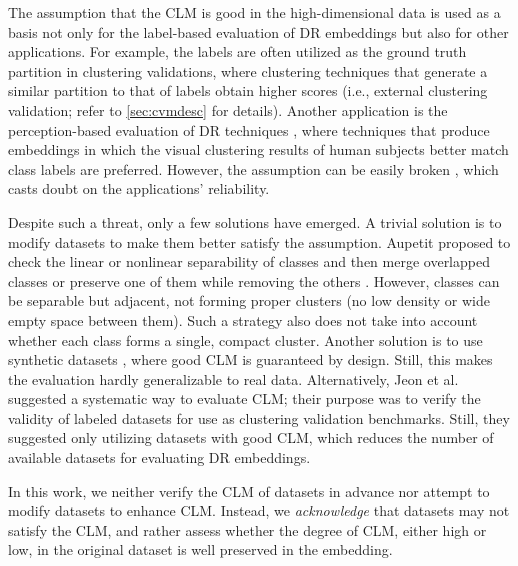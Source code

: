 The assumption that the CLM is good in the high-dimensional data is used as a basis not only for the label-based evaluation of DR embeddings but also for other applications. For example, the labels are often utilized as the ground truth partition in clustering validations, where clustering techniques that generate a similar partition to that of labels obtain higher scores (i.e., external clustering validation; refer to \autoref{sec:cvmdesc} for details). Another application is the perception-based evaluation of DR techniques \cite{xia22tvcg,etemadpour15tvcg, etemadpour15ivapp, sedlmair13tvcg}, where techniques that produce embeddings in which the visual clustering results of human subjects better match class labels are preferred. 
However, the assumption can be easily broken \cite{aupetit14beliv, farber10multiclust}, which casts doubt on the applications' reliability. 

Despite such a threat, only a few solutions have emerged. 
A trivial solution is to modify datasets to make them better satisfy the assumption. Aupetit \cite{aupetit14beliv, aupetit05neurocomputing} proposed to check the linear or nonlinear separability of classes and then merge overlapped classes or preserve one of them while removing the others \cite{aupetit14beliv}. However, classes can be separable but adjacent, not forming proper clusters (no low density or wide empty space between them).  Such a strategy also does not take into account whether each class forms a single, compact cluster. 
Another solution is to use synthetic datasets \cite{jeon21tvcg, moor20icml, jeon22vis}, where good CLM is guaranteed by design. Still, this makes the evaluation hardly generalizable to real data.
Alternatively, Jeon et al. \cite{jeon22arxiv2} suggested a systematic way to evaluate CLM; their purpose was to verify the validity of labeled datasets for use as clustering validation benchmarks.
Still, they suggested only utilizing datasets with good CLM, which reduces the number of available datasets for evaluating DR embeddings.

In this work, we neither verify the CLM of datasets in advance nor attempt to modify datasets to enhance CLM.
 Instead, we \textit{acknowledge} that datasets may not satisfy the CLM, and rather assess whether the degree of CLM, either high or low, in the original dataset is well preserved in the embedding. 

